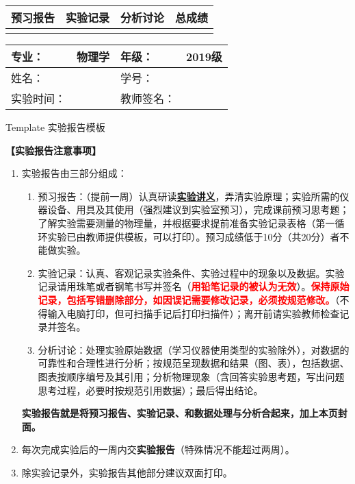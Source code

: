 \documentclass[dvipsnames, svgnames,a4paper,11pt]{article}
\begin{document}
\begin{table}
	\renewcommand\arraystretch{1.7}
	\begin{tabularx}{\textwidth}{
		|X|X|X|X
		|X|X|X|X|}
	\hline
	\multicolumn{2}{|c|}{预习报告}&\multicolumn{2}{|c|}{实验记录}&\multicolumn{2}{|c|}{分析讨论}&\multicolumn{2}{|c|}{总成绩}\\
	\hline
	& & & & & & & \\
	\hline
	\end{tabularx}
\end{table}


\begin{table}
	\renewcommand\arraystretch{1.7}
	\begin{tabularx}{\textwidth}{|X|X|X|X|}
	\hline
	专业：& 物理学 &年级：& 2019级\\
	\hline
	姓名：&   & 学号：&\\
	\hline
	实验时间：& & 教师签名：& \\
	\hline
	\end{tabularx}
\end{table}

\begin{center}
	\LARGE Template \quad 实验报告模板
\end{center}

\textbf{【实验报告注意事项】}
\begin{enumerate}
	\item 实验报告由三部分组成：
	\begin{enumerate}
		\item 预习报告：（提前一周）认真研读\underline{\textbf{实验讲义}}，弄清实验原理；实验所需的仪器设备、用具及其使用（强烈建议到实验室预习），完成课前预习思考题；了解实验需要测量的物理量，并根据要求提前准备实验记录表格（第一循环实验已由教师提供模板，可以打印）。预习成绩低于10分（共20分）者不能做实验。
	    \item 实验记录：认真、客观记录实验条件、实验过程中的现象以及数据。实验记录请用珠笔或者钢笔书写并签名（\textcolor{red}{\textbf{用铅笔记录的被认为无效}}）。\textcolor{red}{\textbf{保持原始记录，包括写错删除部分，如因误记需要修改记录，必须按规范修改。}}（不得输入电脑打印，但可扫描手记后打印扫描件）；离开前请实验教师检查记录并签名。
	    \item 分析讨论：处理实验原始数据（学习仪器使用类型的实验除外），对数据的可靠性和合理性进行分析；按规范呈现数据和结果（图、表），包括数据、图表按顺序编号及其引用；分析物理现象（含回答实验思考题，写出问题思考过程，必要时按规范引用数据）；最后得出结论。
	\end{enumerate}
	\textbf{实验报告就是将预习报告、实验记录、和数据处理与分析合起来，加上本页封面。}
	\item 每次完成实验后的一周内交\textbf{实验报告}（特殊情况不能超过两周）。
	\item 除实验记录外，实验报告其他部分建议双面打印。
\end{enumerate}
\end{document}
